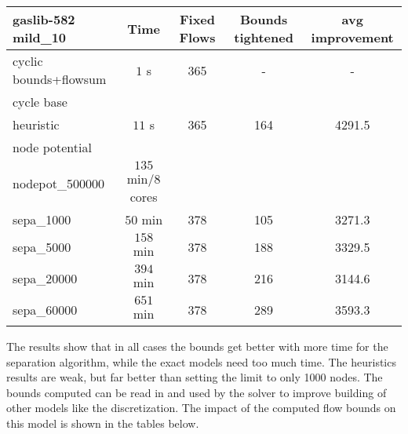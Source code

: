 \begin{center}
\begin{tabular}{ l | c | c | c | c }

\textbf{gaslib-582 mild\_10} & Time  & Fixed Flows & Bounds tightened & avg improvement\\
\hline
 cyclic bounds+flowsum& $1$ s& 365 & - & -\\
 cycle base& $ $ &  &  & \\
 heuristic& $11$ s& 365 & 164 & 4291.5\\
 node potential& $ $ &  &   &  \\ 
 nodepot\_500000& $135$ min/8 cores &  &  &  \\ 
 sepa\_1000& $50$ min & 378 & 105 & 3271.3 \\
 sepa\_5000& $ 158$ min  & 378 & 188 & 3329.5 \\
 sepa\_20000& $ 394$ min & 378 & 216 &3144.6 \\
 sepa\_60000& $651$ min  & 378& 289 & 3593.3 \\
\end{tabular} 
\end{center}

The results show that in all cases the bounds get better with more time for the separation algorithm, while the exact 
models need too much time. The heuristics results are weak, but far better than setting the limit to only 1000 nodes. 
The bounds computed can be read in and used by the solver to improve building of other models like the discretization. 
The impact of the computed flow bounds on this model is shown in the tables below.

